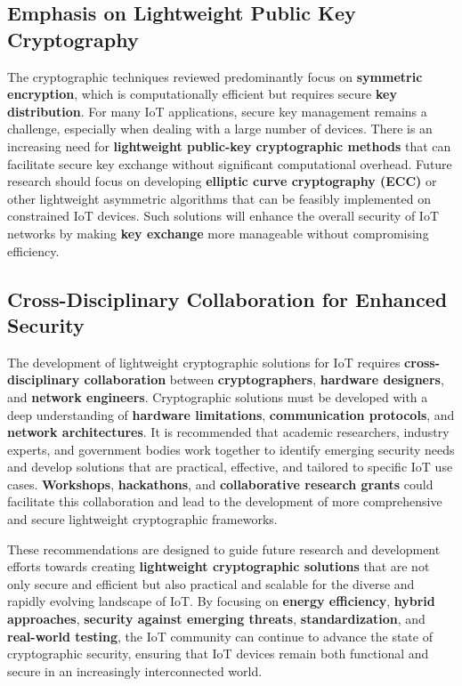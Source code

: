\documentclass{article}
\begin{document}
\subsection{Emphasis on Lightweight Public Key Cryptography}

The cryptographic techniques reviewed predominantly focus on \textbf{symmetric encryption}, which is computationally efficient but requires secure \textbf{key distribution}. For many IoT applications, secure key management remains a challenge, especially when dealing with a large number of devices. There is an increasing need for \textbf{lightweight public-key cryptographic methods} that can facilitate secure key exchange without significant computational overhead. Future research should focus on developing \textbf{elliptic curve cryptography (ECC)} or other lightweight asymmetric algorithms that can be feasibly implemented on constrained IoT devices. Such solutions will enhance the overall security of IoT networks by making \textbf{key exchange} more manageable without compromising efficiency.

\subsection{Cross-Disciplinary Collaboration for Enhanced Security}

The development of lightweight cryptographic solutions for IoT requires \textbf{cross-disciplinary collaboration} between \textbf{cryptographers}, \textbf{hardware designers}, and \textbf{network engineers}. Cryptographic solutions must be developed with a deep understanding of \textbf{hardware limitations}, \textbf{communication protocols}, and \textbf{network architectures}. It is recommended that academic researchers, industry experts, and government bodies work together to identify emerging security needs and develop solutions that are practical, effective, and tailored to specific IoT use cases. \textbf{Workshops}, \textbf{hackathons}, and \textbf{collaborative research grants} could facilitate this collaboration and lead to the development of more comprehensive and secure lightweight cryptographic frameworks.

\medskip

These recommendations are designed to guide future research and development efforts towards creating \textbf{lightweight cryptographic solutions} that are not only secure and efficient but also practical and scalable for the diverse and rapidly evolving landscape of IoT. By focusing on \textbf{energy efficiency}, \textbf{hybrid approaches}, \textbf{security against emerging threats}, \textbf{standardization}, and \textbf{real-world testing}, the IoT community can continue to advance the state of cryptographic security, ensuring that IoT devices remain both functional and secure in an increasingly interconnected world.
\end{document}
